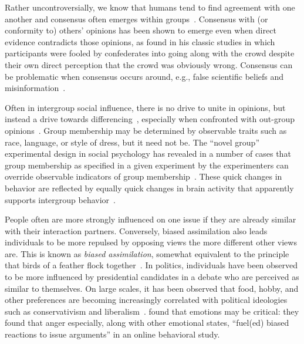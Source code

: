 \documentclass[12pt,letterpaper]{article}
\begin{document}
Rather uncontroversially, we know that humans tend to find agreement with
one another and consensus often 
emerges within groups~\cite{Festinger1954,Cartwright1956,French1956}. 
Consensus with (or conformity to) others' opinions has been shown to emerge 
even when direct evidence contradicts those opinions, as 
found in his classic studies in which participants were fooled by confederates
into going along with the crowd despite their own direct perception that
the crowd was obviously wrong. Consensus can be problematic when
consensus occurs around, e.g., 
false scientific beliefs and 
misinformation~\cite{Zollman2007,Zollman2013,OConnor2018,OConnor2019e}.

Often in intergroup social influence, there is no drive to unite in
opinions, but instead a drive towards differencing~\cite{Tajfel1979,Sherif1988,Flache2011},
especially when confronted with out-group opinions~\cite{Bail2018}.
Group membership may be determined by observable traits such as race, language,
or style of dress, but it need not be. The ``novel group'' experimental design in
social psychology has revealed in a number of cases that group membership
as specified in a given experiment by the experimenters can override observable
indicators of group membership~\cite{Tajfel1971,Billig1973,Tajfel1982}.
These quick changes in behavior are reflected by equally quick changes in 
brain activity that apparently supports intergroup 
behavior~\cite{Cikara2014,Cikara2017}.

People often are more strongly influenced on one issue if they are already
similar with their interaction partners. Conversely, biased assimilation
also leads individuals to be more repulsed by opposing views the more 
different other views are. This is
known as \emph{biased assimilation}, somewhat equivalent to 
the principle that birds of a feather flock together~\cite{Lord1979,McPherson2001}.
In politics, individuals have been observed to be more influenced by presidential
candidates in a debate who are perceived as similar to themselves.
On large scales, it has been observed that food, hobby, and other
preferences are becoming increasingly correlated with political ideologies such
as conservativism and liberalism~\cite{DellaPosta2015}.
 found that emotions may be critical: they found that
anger especially, along with other emotional states, ``fuel(ed) biased reactions
to issue arguments'' in an online behavioral study. 
\end{document}
